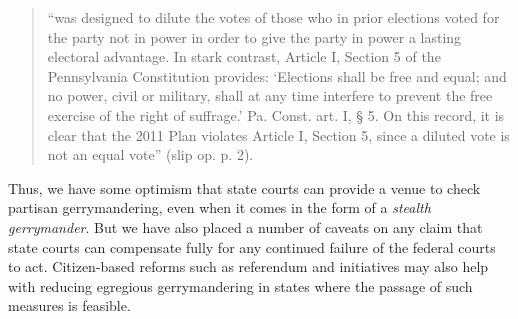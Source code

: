     \begin{quote}
        ``was designed to dilute the votes of those who in prior elections voted for the party not in power in order to give the party in power a lasting electoral advantage. In stark contrast, Article I, Section 5 of the Pennsylvania Constitution provides: ‘Elections shall be free and equal; and no power, civil or military, shall at any time interfere to prevent the free exercise of the right of suffrage.’ Pa. Const. art. I, § 5. On this record, it is clear that the 2011 Plan violates Article I, Section 5, since a diluted vote is not an equal vote'' (slip op. p. 2).
    \end{quote}
\par
	Thus, we have some optimism that state courts can provide a venue to check partisan gerrymandering, even when it comes in the form of a \textit{stealth gerrymander}. But we have also placed a number of caveats on any claim that state courts can compensate fully for any continued failure of the federal courts to act. Citizen-based reforms such as referendum and initiatives may also help with reducing egregious gerrymandering in states where the passage of such measures is feasible.
